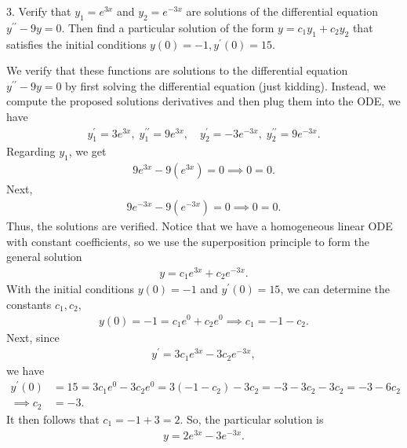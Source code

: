 \documentclass{report}
\begin{document}
    \bigbreak \noindent 
    \begin{mdframed}
        3. Verify that $y_{1} = e^{3x}$ and $y_{2} = e^{-3x}$ are solutions of the differential equation $y^{\prime\prime} - 9y = 0$. Then find a particular solution of the form $y = c_{1}y_{1} + c_{2}y_{2}$ that satisfies the initial conditions $y(0) = -1, y^{\prime}(0) = 15$.
    \end{mdframed}
    \bigbreak \noindent 
    We verify that these functions are solutions to the differential equation $y^{\prime\prime} - 9y = 0$ by first solving the differential equation (just kidding). Instead, we compute the proposed solutions derivatives and then plug them into the ODE, we have
    \begin{align*}
        y_{1}^{\prime} = 3e^{3x},\; y_{1}^{\prime\prime} = 9e^{3x}, \quad y_{2}^{\prime} = -3e^{-3x}, \; y_{2}^{\prime\prime} = 9e^{-3x}
    .\end{align*}
    Regarding $y_{1}$, we get
    \begin{align*}
       9e^{3x} -9(e^{3x}) = 0 \implies 0 = 0 
    .\end{align*}
    Next,
    \begin{align*}
        9e^{-3x} - 9(e^{-3x}) = 0 \implies 0 = 0 
    .\end{align*}
    Thus, the solutions are verified. Notice that we have a homogeneous linear ODE with constant coefficients, so we use the superposition principle to form the general solution
    \begin{align*}
        y = c_{1}e^{3x} + c_{2}e^{-3x}
    .\end{align*}
    With the initial conditions $y(0) = -1$ and $y^{\prime}(0) = 15$, we can determine the constants $c_{1}, c_{2}$, 
    \begin{align*}
        y(0) = -1 = c_{1}e^{0} + c_{2}e^{0} \implies c_{1} = -1-c_{2}
    .\end{align*}
    Next, since
    \begin{align*}
        y^{\prime} = 3c_{1}e^{3x} - 3c_{2}e^{-3x}
    ,\end{align*}
    we have
    \begin{align*}
        y^{\prime}(0) &= 15 = 3c_{1}e^{0} - 3c_{2}e^{0} = 3(-1-c_{2})-3c_{2} = -3-3c_{2}-3c_{2} = -3-6c_{2} \\
        \implies c_{2} &= -3
    .\end{align*}
    It then follows that $c_{1} = -1 + 3 = 2$. So, the particular solution is
    \begin{align*}
        y = 2e^{3x} -3e^{-3x}
    .\end{align*}
\end{document}
